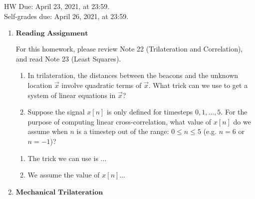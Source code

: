 \documentclass[11pt]{article}
\begin{document}
\maketitle
\fontsize{12}{15}\selectfont

\begin{center}
	HW Due: April 23, 2021, at 23:59. \\
	Self-grades due: April 26, 2021, at 23:59.
\end{center}

\begin{enumerate}
	\item $\textbf{Reading Assignment}$
	      	      	              
	      For this homework, please review Note 22 (Trilateration and Correlation), and read Note 23 (Least Squares).

	      \begin{enumerate}
	          \item In trilateration, the distances between the beacons and the unknown location $\vec x$ involve quadratic terms of $\vec x$. What trick can we use to get a system of linear equations in $\vec x$?
	          \item Suppose the signal $x[n]$ is only defined for timesteps $0, 1, \ldots, 5$. For the purpose of computing linear cross-correlation, what value of $x[n]$ do we assume when $n$ is a timestep out of the range: $0 \leq n \leq 5$ (e.g. $n = 6$ or $n = -1$)?
	      \end{enumerate}
	      \begin{Answer}
	      	\begin{enumerate}
	          \item The trick we can use is $\ldots$
	          \item We assume the value of $x[n]\ldots$ 
	        \end{enumerate}
	      \end{Answer}
	      	      	      
	      	      	      
	\newpage
	\item $\textbf{Mechanical Trilateration}$
	      	      	         

\end{enumerate}
\end{document}
